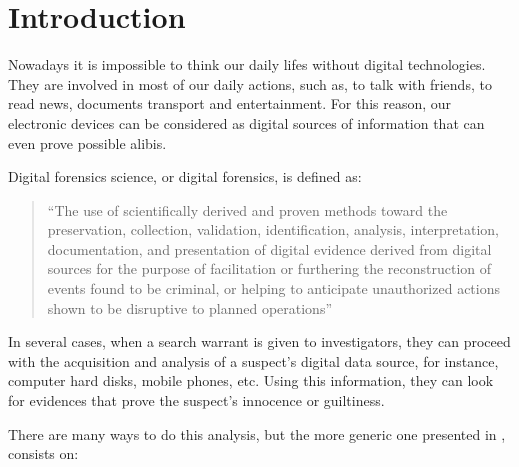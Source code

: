 \cleardoublepage
{}
\chapter*{Introduction}

Nowadays it is impossible to think our daily lifes without digital
technologies. They are involved in most of our daily actions, such as, to talk
with friends, to read news, documents transport and entertainment. For this
reason, our electronic devices can be considered as digital sources of 
information that can even prove possible alibis.

Digital forensics science, or digital forensics, is defined as:

\begin{quote}
“The use of scientifically derived and proven methods toward the preservation,
collection, validation, identification, analysis, interpretation,
documentation, and presentation of digital evidence derived from digital
sources for the purpose of facilitation or furthering the reconstruction of
events found to be criminal, or helping to anticipate unauthorized actions
shown to be disruptive to planned operations” \cite{DFRWS-df-road-map}
\end{quote}

In several cases, when a search warrant is given to investigators, they can
proceed with the acquisition and analysis of a suspect's digital data source,
for instance, computer hard disks, mobile phones, etc. Using this information,
they can look for evidences that prove the suspect's innocence or guiltiness.

There are many ways to do this analysis, but the more generic one presented in
\cite{ds-phases}, consists on:

